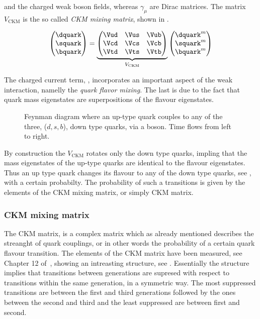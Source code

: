\noindent and \Wpm the charged weak boson fields, whereas $\gamma_\mu$ are Dirac matrices.
The matrix $V_{\text{CKM}}$ is the so called {\it CKM mixing matrix}, shown in .

\begin{equation}
  \begin{pmatrix} \dquark \\ \squark \\ \bquark  \end{pmatrix} =
  \underbrace{\begin{pmatrix} \Vud & \Vus & \Vub \\ \Vcd & \Vcs & \Vcb \\ \Vtd & \Vts & \Vtb \end{pmatrix}}_{V_{\text{CKM}}}
    \begin{pmatrix} \dquark^m \\ \squark^m \\ \bquark^m  \end{pmatrix}
  \label{quark_field_rotation}
  \end{equation}

The charged current term, , incorporates an important aspect of the weak interaction,
namelly the {\it quark flavor mixing}. The last is due to the fact that quark mass eigenstates are superpositions
of the flavour eigenstates.

\begin{figure}[h]
  \centering
  {\sffamily }
  \caption{Feynman diagram where an up-type quark couples to any of the three, ($d,s,b$), down type quarks,
           via a \Wp boson. Time flows from left to right.}
  \label{QuarkMixing}
\end{figure}

\noindent By construction the $V_{\text{CKM}}$ rotates only the down type quarks, impling that
the mass eigenstates of the up-type quarks are identical to the flavour eigenstates. Thus an up type quark
changes its flavour to any of the down type quarks, see , with a certain probabilty.
The probability of such a transitions is given by the elements of the CKM mixing matrix, or simply CKM matrix.

\subsubsection{CKM mixing matrix}
The CKM matrix, is a complex matrix which as already mentioned describes the streanght of quark couplings,
or in other words the probability of a certain quark flavour transition. The elements of the CKM matrix have been measured, see Chapter 12 of~\cite{PDG},
showing an intreasting structure, see . Essentially the structure implies that transitions between generations
are supresed with respect to transitions within the same generation, in a symmetric way. The most suppressed transitions are between
the first and third generations followed by the ones between the second and third and the least suppressed are between first and second.

